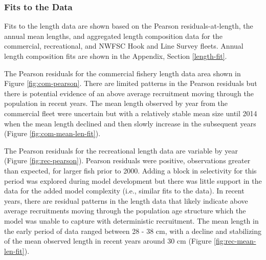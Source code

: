 \documentclass[11pt,
  english,
  a4paper,
]{article}
\begin{document}
\leavevmode\tagmcend\tagstructend\par


\hypertarget{fits-to-the-data}{%
\subsubsection{Fits to the Data}\label{fits-to-the-data}}

\leavevmode\tagmcend\tagstructend


Fits to the length data are shown based on the Pearson residuals-at-length, the annual mean lengths, and aggregated length composition data for the commercial, recreational, and NWFSC Hook and Line Survey fleets. Annual length composition fits are shown in the Appendix, Section \ref{length-fit}.

\leavevmode\tagmcend\tagstructend\par


The Pearson residuals for the commercial fishery length data area shown in Figure \ref{fig:com-pearson}. There are limited patterns in the Pearson residuals but there is potential evidence of an above average recruitment moving through the population in recent years. The mean length observed by year from the commercial fleet were uncertain but with a relatively stable mean size until 2014 when the mean length declined and then slowly increase in the subsequent years (Figure \ref{fig:com-mean-len-fit}).

\leavevmode\tagmcend\tagstructend\par


The Pearson residuals for the recreational length data are variable by year (Figure \ref{fig:rec-pearson}). Pearson residuals were positive, observations greater than expected, for larger fish prior to 2000. Adding a block in selectivity for this period was explored during model development but there was little support in the data for the added model complexity (i.e., similar fits to the data). In recent years, there are residual patterns in the length data that likely indicate above average recruitments moving through the population age structure which the model was unable to capture with deterministic recruitment. The mean length in the early period of data ranged between 28 - 38 cm, with a decline and stabilizing of the mean observed length in recent years around 30 cm (Figure \ref{fig:rec-mean-len-fit}).
\end{document}
